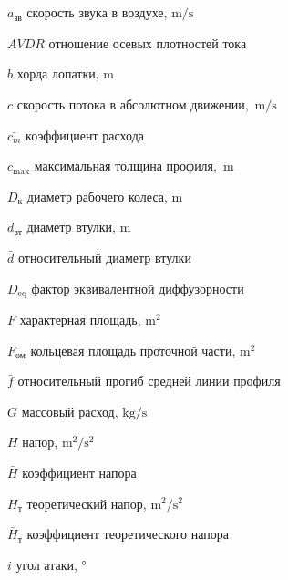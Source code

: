 \chapter*{\nomname}             %
\eqexplSetIntro{}

\begin{eqexpl}[10mm]
\item{\(a_{\text{зв}}\)} скорость звука в воздухе, $\si\meter/\si\second$
\item{\(AVDR\)} отношение осевых плотностей тока
\item{\(b\)} хорда лопатки, $\si\meter$
\item{\(c\)} скорость потока в абсолютном движении,~\(\si\meter/\si\second\)
\item{\(\bar{c_m}\)} коэффициент расхода
\item{\(c_\mathrm{max}\)} максимальная толщина профиля,~\(\si\meter\)
\item{\(D_\text{к}\)} диаметр рабочего колеса, \(\si\meter\)
\item{\(d_\text{вт}\)} диаметр втулки, \(\si\meter\)
\item{$\bar{d}$} относительный диаметр втулки
\item{$D_\text{eq}$} фактор эквивалентной диффузорности
\item{\(F\)} характерная площадь, \(\si{\meter}^2\)
\item{\(F_{\text{ом}}\)} кольцевая площадь проточной части, \(\si{\meter}^2\)
\item{\(\bar{f}\)} относительный прогиб средней линии профиля
\item{\(G\)} массовый расход, \(\si\kilogram/\si\second\)
\item{\({H}\)} напор, \(\si\meter^2/\si\second^2\)
\item{\(\bar{H}\)} коэффициент напора
\item{\({H}_{\text{т}}\)} теоретический напор, \(\si\meter^2/\si\second^2\)
\item{\(\bar{H}_{\text{т}}\)} коэффициент теоретического напора
\item{\(i\)} угол атаки, \(\si\degree\)

\end{eqexpl}
